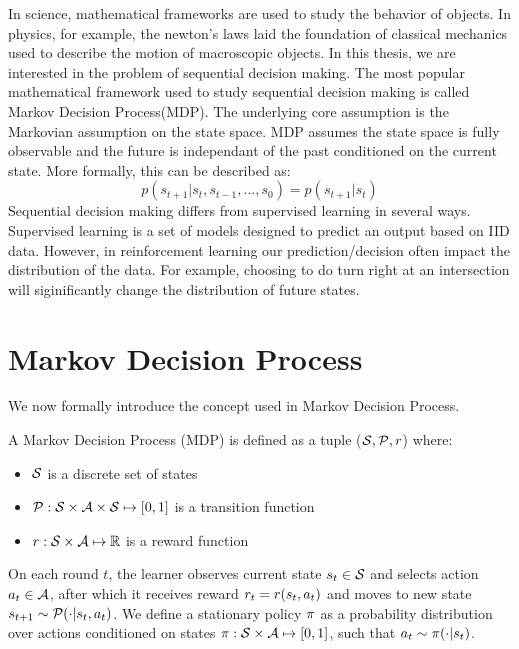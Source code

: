 In science, mathematical frameworks are used to study the behavior of objects. In physics, for example, the newton's laws laid the foundation of classical mechanics used to describe the motion of macroscopic objects.
In this thesis, we are interested in the problem of sequential decision making. The most popular mathematical framework used to study sequential decision making is called Markov Decision Process(MDP). The underlying core assumption is the Markovian assumption on the state space. MDP assumes the state space is fully observable and the future is independant of the past conditioned on the current state. More formally, this can be described as:
\begin{equation}
        p(s_{t+1} | s_{t},s_{t-1},...,s_0) = p(s_{t+1} | s_t)
\end{equation}
Sequential decision making differs from supervised learning in several ways. Supervised learning is a set of models designed to predict an output based on IID data. However, in reinforcement learning our prediction/decision often impact the distribution of the data. For example, choosing to do turn right at an intersection will siginificantly change the distribution of future states. 

\section{Markov Decision Process}
We now formally introduce the concept used in Markov Decision Process.
\begin{definition}
A Markov Decision Process (MDP) is defined as a tuple ($\mathcal{S},\mathcal{P},r$) where:
\begin{itemize}
    \item $\mathcal{S}$ is a discrete set of states 
    \item $\mathcal{P} : \mathcal{S} \times \mathcal{A} \times \mathcal{S} \mapsto [0,1]$ is a transition function 
    \item  $r : \mathcal{S} \times \mathcal{A} \mapsto \mathbb{R}$ is a reward function
\end{itemize}
\end{definition}
On each round $t$, the learner observes current state $s_t\in\mathcal{S}$ and selects action $a_t\in\mathcal{A}$, after which it receives reward $r_t = r(s_t,a_t)$ and moves to new state $s_{t+1}\sim \mathcal{P}(\cdot|s_t, a_t)$. We define a stationary policy $\pi$ as a probability distribution over actions conditioned on states $\pi : \mathcal{S} \times \mathcal{A} \mapsto [0,1]$, such that $a_t \sim \pi(\cdot|s_t)$.

